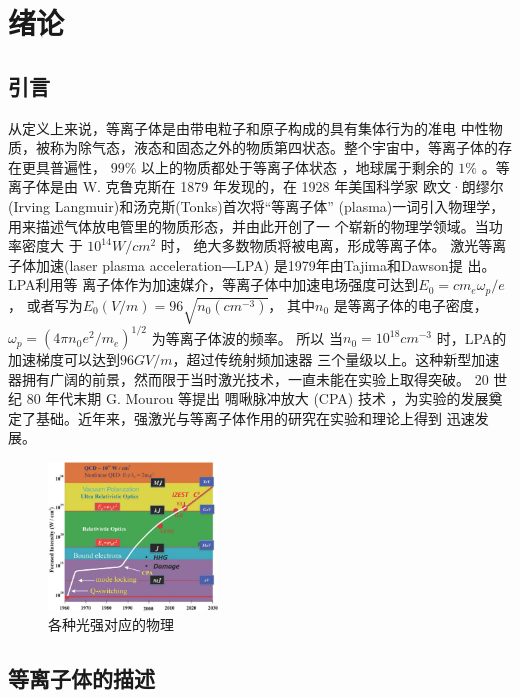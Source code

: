
\chapter{绪论}
\label{chap:introduction}


\section{引言}

从定义上来说，等离子体是由带电粒子和原子构成的具有集体行为的准电
中性物质，被称为除气态，液态和固态之外的物质第四状态。整个宇宙中，等离子体的存在更具普遍性， $99\%$ 以上的物质都处于等离子体状态 \cite{chen1984plasma}
，地球属于剩余的 $1\%$ 。等离子体是由 W. 克鲁克斯在 1879 年发现的，在 1928 年美国科学家
欧文·朗缪尔(Irving Langmuir)和汤克斯(Tonks)首次将“等离子体”
(plasma)一词引入物理学，用来描述气体放电管里的物质形态，并由此开创了一
个崭新的物理学领域。当功率密度大
于 $10^{14}W / {cm}^2$ 时， 绝大多数物质将被电离，形成等离子体。 激光等离子体加速(laser plasma acceleration―LPA) 是1979年由Tajima和Dawson提
出\cite{tajima1979laser}。 LPA利用等
离子体作为加速媒介，等离子体中加速电场强度可达到$E_0 = c{m_e} {\omega}_p /e$，
或者写为$E_0 (V/m) =96 \sqrt{n_0 (cm^{-3} )}$，
其中$n_0$ 是等离子体的电子密度， ${\omega}_p = (4\pi n_0 e^2 /{m_e} )^{1/2}$ 为等离子体波的频率。 所以
当$n_0 = 10 ^{18} {cm} ^{- 3}$ 时，LPA的加速梯度可以达到$96 GV/m$，超过传统射频加速器
三个量级以上。这种新型加速器拥有广阔的前景，然而限于当时激光技术，一直未能在实验上取得突破。 20 世纪 80 年代末期 G. Mourou 等提出
啁啾脉冲放大 (CPA) 技术 \cite{strickland1985compression} ，为实验的发展奠定了基础。近年来，强激光与等离子体作用的研究在实验和理论上得到
迅速发展。

\begin{figure}[!htbp]
  \centering
  \includegraphics[width=0.4\textwidth]{Img/moraulaser.eps}
  \caption{各种光强对应的物理}
  \label{fig:moraulaser}
\end{figure}


\section{等离子体的描述}


